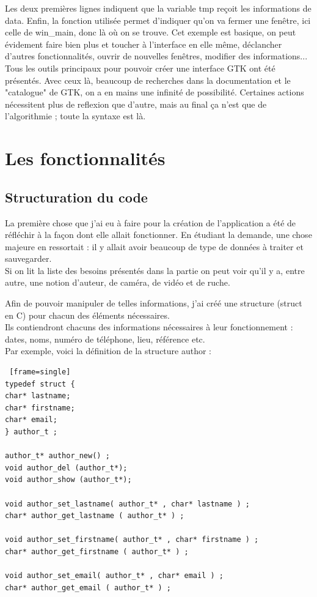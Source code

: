\documentclass[11pt,french,a4paper]{report}
\begin{document}
Les deux premières lignes indiquent que la variable tmp reçoit les informations de data. 
Enfin, la fonction utilisée permet d'indiquer qu'on va fermer une fenêtre, ici celle de win\_main, donc là où on
se trouve. Cet exemple est basique, on peut évidement faire bien plus et toucher à l'interface en elle même, déclancher
d'autres fonctionnalités, ouvrir de nouvelles fenêtres, modifier des informations...\\

Tous les outils principaux pour pouvoir créer une interface GTK ont été présentés. Avec ceux là, beaucoup de recherches
dans la documentation et le "catalogue" %
de GTK, on a en mains une infinité de possibilité. Certaines actions nécessitent plus de reflexion que d'autre, mais 
au final ça n'est que de l'algorithmie ; toute la syntaxe est là. \\


    \section{Les fonctionnalités} 
        \subsection{Structuration du code}
La première chose que j'ai eu à faire pour la création de l'application a été de réfléchir à la façon dont elle allait fonctionner.
En étudiant la demande, une chose majeure en ressortait : il y allait avoir beaucoup de type de données à traiter et sauvegarder. \\
Si on lit la liste des besoins présentés dans la partie %
on peut voir qu'il y a, entre autre, une notion d'auteur, de caméra, de vidéo et de ruche.

Afin de pouvoir manipuler de telles informations, j'ai créé une structure (struct en C) pour chacun des éléments nécessaires. \\
Ils contiendront chacuns des informations nécessaires à leur fonctionnement : dates, noms, numéro de téléphone, lieu, référence etc. \\

Par exemple, voici la définition de la structure author : 
\begin{lstlisting} [frame=single]
typedef struct {
char* lastname;
char* firstname;
char* email;
} author_t ;

author_t* author_new() ;
void author_del (author_t*);
void author_show (author_t*);

void author_set_lastname( author_t* , char* lastname ) ;
char* author_get_lastname ( author_t* ) ;

void author_set_firstname( author_t* , char* firstname ) ;
char* author_get_firstname ( author_t* ) ;

void author_set_email( author_t* , char* email ) ;
char* author_get_email ( author_t* ) ;
\end{lstlisting}
\end{document}
